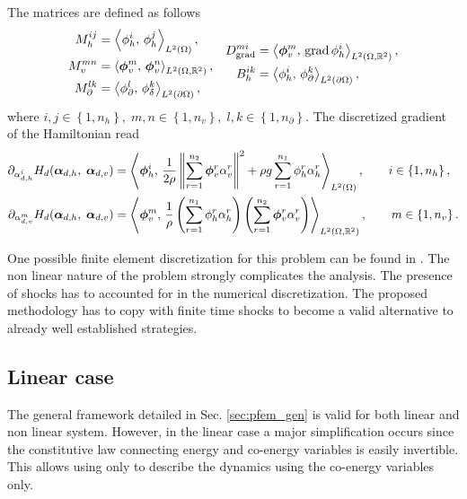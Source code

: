The matrices are defined as follows 
\begin{equation}
\begin{aligned}
M_h^{ij} &= \inner[L^2(\Omega)]{\phi_h^i}{\phi_h^j}, \\
M_v^{mn} &= \inner[L^2(\Omega, \mathbb{R}^2)]{\bm\phi_v^m}{\bm\phi_v^n}, \\
M_\partial^{lk} &= \inner[L^2(\partial\Omega)]{\phi_\partial^l}{\phi_\delta^k},
\end{aligned}\quad
\begin{aligned}
{D}_{\grad}^{mi} &= \inner[L^2(\Omega, \mathbb{R}^2)]{\bm\phi_v^m}{\grad \phi_h^i}, \\
{B}_{h}^{ik} &= \inner[L^2(\partial\Omega)]{\phi_h^i}{\phi_\partial^k}, \\
\end{aligned}
\end{equation}
where $i, j \in \left\{1, n_h\right\}, \; m,n \in \left\{1, n_v\right\}, \; l, k \in \left\{1, n_\partial \right\}$. 
The discretized gradient of the Hamiltonian read
\begin{equation}
\begin{aligned}
\partial_{{\alpha}_{d, h}^i} H_d(\bm{\alpha}_{d, h},\; \bm{\alpha}_{d, v}) &= \inner[L^2(\Omega)]{\bm\phi_h^i}{\frac{1}{2 \rho} \norm{\sum_{r=1}^{n_2} \bm{\phi}_v^r \alpha_v^r}^2 + \rho g \sum_{r=1}^{n_1} {\phi}_h^r \alpha_h^r}, \qquad i \in \left\{1, n_h\right\}, \\
\partial_{{\alpha}_{d, v}^m} H_d(\bm{\alpha}_{d, h},\; \bm{\alpha}_{d, v}) &= \inner[L^2(\Omega, \mathbb{R}^2)]{\bm\phi_v^m}{\frac{1}{\rho} \left(\sum_{r=1}^{n_1} {\phi}_h^r \alpha_h^r\right) \left(\sum_{r=1}^{n_2} \bm{\phi}_v^r \alpha_v^r \right)}, \qquad m \in \left\{1, n_v\right\}.
\end{aligned}
\end{equation}

One possible finite element discretization for this problem can be found in \cite{pironneau1989finite}. The non linear nature of the problem strongly complicates the analysis. The presence of shocks has to accounted for in the numerical discretization. The proposed methodology has to copy with finite time shocks to become a valid alternative to already well established strategies.


\subsection{Linear case}
The general framework detailed in Sec. \ref{sec:pfem_gen} is valid for both linear and non linear system. However, in the linear case a major simplification occurs since the constitutive law connecting energy and co-energy variables is easily invertible. This allows using only to describe the dynamics using the co-energy variables only. \\

